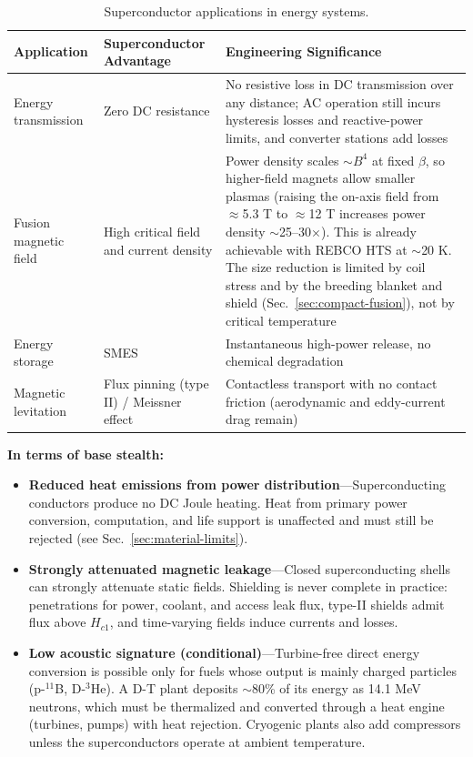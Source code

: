 \documentclass[aps,prd,twocolumn,superscriptaddress,nofootinbib]{revtex4-2}
\begin{document}
\begin{table}[htbp]
\caption{Superconductor applications in energy systems.}
\label{tab:superconductor-apps}
\footnotesize
\begin{tabular}{P{0.177\textwidth}P{0.216\textwidth}P{0.504\textwidth}}
\toprule
Application & Superconductor Advantage & Engineering Significance \\
\midrule
Energy transmission & Zero DC resistance & No resistive loss in DC transmission over any distance; AC operation still incurs hysteresis losses and reactive-power limits, and converter stations add losses \\
Fusion magnetic field & High critical field and current density & Power density scales ${\sim}B^{4}$ at fixed $\beta$, so higher-field magnets allow smaller plasmas (raising the on-axis field from $\approx$5.3 T to $\approx$12 T increases power density ${\sim}$25--30$\times$). This is already achievable with REBCO HTS at ${\sim}$20 K. The size reduction is limited by coil stress and by the breeding blanket and shield (Sec.~\ref{sec:compact-fusion}), not by critical temperature \\
Energy storage & SMES & Instantaneous high-power release, no chemical degradation \\
Magnetic levitation & Flux pinning (type II) / Meissner effect & Contactless transport with no contact friction (aerodynamic and eddy-current drag remain) \\
\bottomrule
\end{tabular}
\end{table}

\textbf{In terms of base stealth:}

\begin{itemize}
  \item \textbf{Reduced heat emissions from power distribution}---Superconducting conductors produce no DC Joule heating. Heat from primary power conversion, computation, and life support is unaffected and must still be rejected (see Sec.~\ref{sec:material-limits}).
  \item \textbf{Strongly attenuated magnetic leakage}---Closed superconducting shells can strongly attenuate static fields. Shielding is never complete in practice: penetrations for power, coolant, and access leak flux, type-II shields admit flux above $H_{c1}$, and time-varying fields induce currents and losses.
  \item \textbf{Low acoustic signature (conditional)}---Turbine-free direct energy conversion is possible only for fuels whose output is mainly charged particles (p-${}^{11}$B, D-${}^{3}$He). A D-T plant deposits ${\sim}$80\% of its energy as 14.1 MeV neutrons, which must be thermalized and converted through a heat engine (turbines, pumps) with heat rejection. Cryogenic plants also add compressors unless the superconductors operate at ambient temperature.
\end{itemize}
\end{document}
